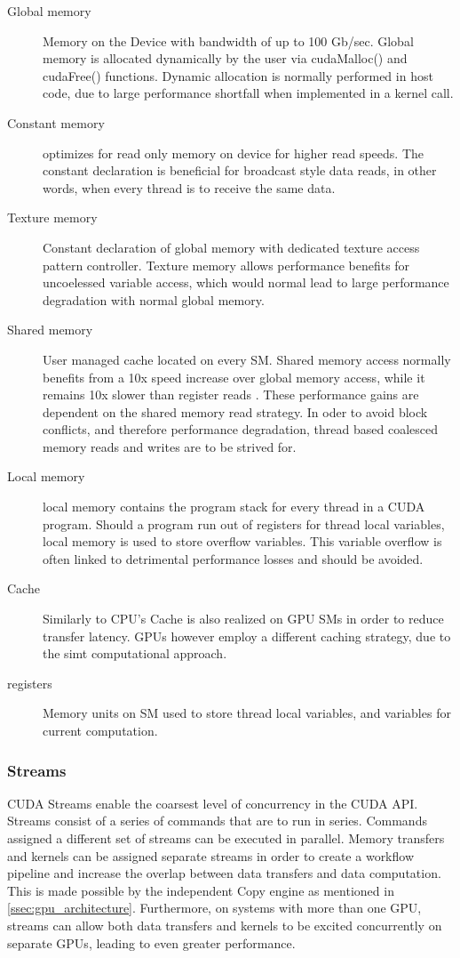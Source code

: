 \begin{description}
  \item [Global memory] Memory on the Device with bandwidth of up to 100 Gb/sec.
  Global memory is allocated dynamically by the user via cudaMalloc() and cudaFree() functions.
  Dynamic allocation is normally performed in host code, due to large performance shortfall
  when implemented in a kernel call.
  \item [Constant memory] optimizes for read only memory on device for higher
  read speeds.  The constant declaration is beneficial for broadcast style data
  reads, in other words, when every thread is to receive the same data.
  \item [Texture memory] Constant declaration of global memory with dedicated
   texture access pattern controller.  Texture memory allows performance benefits
   for uncoelessed variable access, which would normal lead to large performance
   degradation with normal global memory.
  \item [Shared memory] User managed cache located on every \Gls{SM}.  Shared memory access
  normally benefits from a 10x speed increase over global memory access, while it remains
  10x slower than register reads \cite{Wilt}.  These performance gains are dependent
  on the shared memory read strategy.  In oder to avoid block conflicts, and therefore
  performance degradation, thread based coalesced memory reads and writes are to
  be strived for.
  \item [Local memory] local memory contains the program stack for every thread
  in a CUDA program. Should a program run out of registers for thread local variables,
  local memory is  used to store overflow variables. This variable overflow is often
  linked to detrimental performance losses and should be avoided.\cite{Wilt}
  \item [Cache] Similarly to CPU's Cache is also realized on GPU \glspl{SM} in order
  to reduce transfer latency.  \glspl{GPU} however employ a different caching strategy,
  due to the \gls{simt} computational approach.
  \item [registers] Memory units on \Gls{SM} used to store thread local variables,
                    and variables for current computation.
\end{description}

\subsubsection{Streams}\label{sssec:streams}
CUDA Streams enable the coarsest level of concurrency in the CUDA API.  Streams
 consist of a series of commands that are to run in series.  Commands assigned
a different set of streams can be executed in parallel. Memory transfers and
kernels can be assigned separate streams in order to create a workflow pipeline and increase
the overlap between data transfers and data computation. This is made possible by the
independent Copy engine as mentioned in \ref{ssec:gpu_architecture}.  Furthermore,
on systems with more than one \Gls{GPU}, streams can allow both data transfers and
kernels to be excited concurrently on separate \Glspl{GPU}, leading to even greater
performance.
